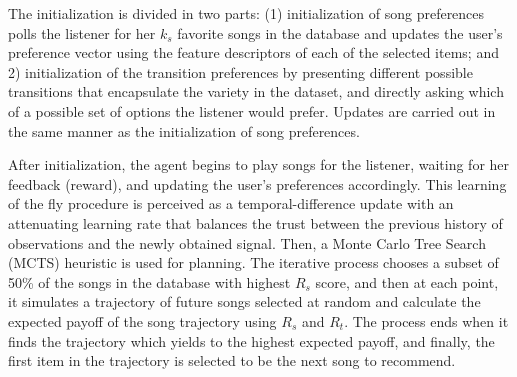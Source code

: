 The initialization is divided in two parts: (1) initialization of song preferences polls the listener for her $k_s$ favorite songs in the database and updates the user's preference vector 
using the feature descriptors of each of the selected items; and 2) initialization of the transition preferences by presenting different possible transitions that encapsulate the variety in the dataset, and directly asking which of a possible set of options the listener would prefer. Updates are carried out in the same manner as the initialization of song preferences.

After initialization, the agent begins to play songs for the listener, waiting for her feedback (reward), and updating the user's preferences accordingly. This learning of the fly procedure is perceived as a temporal-difference update with an attenuating learning rate that balances the trust between the previous history of observations and the newly obtained signal.
%
Then, a Monte Carlo Tree Search (MCTS) heuristic\cite{chaslot2010monte} is used for planning. The iterative process chooses a subset of 50\% of the songs in the database with highest $R_s$ score, and then at each point, it simulates a trajectory of future songs selected at random and calculate the expected payoff of the song trajectory using $R_s$ and $R_t$. The process ends when it finds the trajectory which yields to the highest expected payoff, and finally, the first item in the trajectory is selected to be the next song to recommend.

